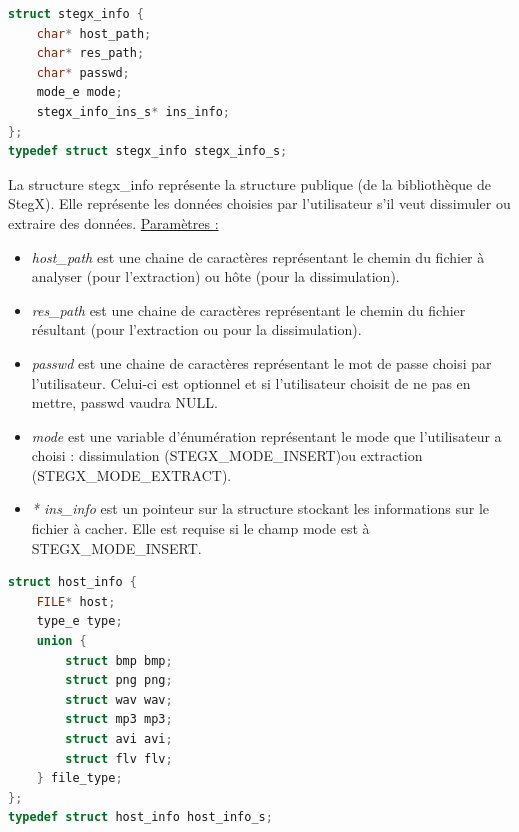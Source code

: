 \documentclass[11pt]{article}
\begin{document}
\begin{lstlisting}[language=c]
struct stegx_info {
    char* host_path;
    char* res_path;                         
    char* passwd;                           
    mode_e mode;                            
    stegx_info_ins_s* ins_info;             
};
typedef struct stegx_info stegx_info_s;
\end{lstlisting}

La structure stegx\_info représente la structure publique (de la bibliothèque
de StegX). Elle représente les données choisies par l'utilisateur s'il veut 
dissimuler ou extraire des données. \newline
\underline{Paramètres :}
\begin{itemize}
\item \textit{host\_path} est une chaine de caractères représentant le chemin
du fichier à analyser (pour l'extraction) ou hôte (pour la dissimulation). 
\item \textit{res\_path} est une chaine de caractères représentant le chemin
du fichier résultant (pour l'extraction ou pour la dissimulation). 
\item \textit{passwd} est une chaine de caractères représentant le mot de passe 
choisi par l'utilisateur. Celui-ci est optionnel et si l'utilisateur choisit 
de ne pas en mettre, passwd vaudra NULL. 
\item \textit{mode} est une variable d'énumération représentant le mode que 
l'utilisateur a choisi : dissimulation (STEGX\_MODE\_INSERT)ou extraction 
(STEGX\_MODE\_EXTRACT). 
\item \textit{* ins\_info} est un pointeur sur la structure stockant les informations 
sur le fichier à cacher. Elle est requise si le champ mode est à STEGX\_MODE\_INSERT. 
\newline
\end{itemize}

\begin{lstlisting}[language=c]
struct host_info {
    FILE* host;
    type_e type;
    union {
        struct bmp bmp;
        struct png png;
        struct wav wav;
        struct mp3 mp3;
        struct avi avi;
        struct flv flv;
    } file_type;
};
typedef struct host_info host_info_s;
\end{lstlisting}
\end{document}
